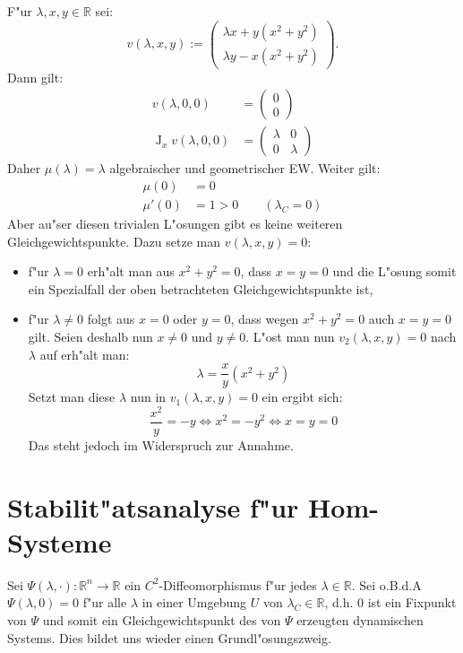 \documentclass[a4paper, 13pt]{scrreprt}
\theoremstyle{definition} \newtheorem{definition}{Definition}[section]
\newenvironment{beispiel}[1][Beispiel]{\begin{trivlist}
\item[\hskip \labelsep {\bfseries #1}]}{\end{trivlist}}
\newcommand{\RR}{\mathbb{R}}
\begin{document}
\begin{beispiel}
F"ur $\lambda,x,y\in\RR$ sei:
\[
v(\lambda,x,y):=\begin{pmatrix}
\lambda x + y(x^2+y^2)\\
\lambda y - x(x^2+y^2)
\end{pmatrix}.
\]
Dann gilt:
\begin{align*}
v(\lambda,0,0) &= \begin{pmatrix}
0\\
0
\end{pmatrix}\\
\operatorname{J}_xv(\lambda,0,0) &= \left(\begin{array}{cc}
\lambda & 0\\
0 & \lambda
\end{array}\right)
\end{align*}
Daher $\mu(\lambda) = \lambda$ algebraischer und geometrischer EW. Weiter gilt:
\begin{align*}
\mu(0) &= 0\\
\mu'(0) &= 1 > 0\qquad (\lambda_C = 0)
\end{align*}
Aber au"ser diesen trivialen L"osungen gibt es keine weiteren Gleichgewichtspunkte. Dazu setze man $v(\lambda,x,y) = 0$:
\begin{itemize}
\item
f"ur $\lambda = 0$ erh"alt man aus $x^2+y^2 = 0$, dass $x = y = 0$ und die L"osung somit ein Spezialfall der oben betrachteten Gleichgewichtspunkte ist,

\item
f"ur $\lambda\neq 0$ folgt aus $x = 0$ oder $y = 0$, dass wegen $x^2+y^2 = 0$ auch $x = y = 0$ gilt. Seien deshalb nun $x\neq 0$ und $y\neq 0$. L"ost man nun $v_2(\lambda,x,y)=0$ nach $\lambda$ auf erh"alt man:
\[\lambda = \frac{x}{y}(x^2+y^2)\]
Setzt man diese $\lambda$ nun in $v_1(\lambda,x,y)=0$ ein ergibt sich:
\[
\frac{x^2}{y} = -y \Leftrightarrow x^2 = -y^2 \Leftrightarrow x = y = 0
\]
Das steht jedoch im Widerspruch zur Annahme.
\end{itemize}
\end{beispiel}


\section{Stabilit"atsanalyse f"ur Hom-Systeme}

Sei $\Psi(\lambda,\cdot)\colon\mathbb{R}^n\to\mathbb{R}$ ein $C^2$-Diffeomorphismus f"ur jedes $\lambda\in\mathbb{R}$. 
Sei o.B.d.A $\Psi(\lambda,0)=0$ f"ur alle $\lambda$ in einer Umgebung $U$ von $\lambda_C\in\RR$, d.h. $0$ ist ein Fixpunkt von $\Psi$ und somit ein Gleichgewichtspunkt des von $\Psi$ erzeugten dynamischen Systems. Dies bildet uns wieder einen Grundl"osungszweig.
\end{document}
